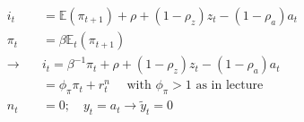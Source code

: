 {\begin{enumerate}[label=(\alph*)]
{$$
\begin{aligned}
i_{t} & =\mathbb{E}\left(\pi_{t+1}\right)+\rho+\left(1-\rho_{z}\right) z_{t}-\left(1-\rho_{a}\right) a_{t} \\
\pi_{t} & =\beta \mathbb{E}_{t}\left(\pi_{t+1}\right) \\
\longrightarrow \quad & i_t=\beta^{-1} \pi_{t}+\rho+\left(1-\rho_{z}\right) z_{t}-\left(1-\rho_{a}\right) a_{t} \\
& =\phi_{\pi} \pi_{t}+r_{t}^{n} \quad \text { with } \phi_{\pi}>1 \text { as in lecture } \\
n_{t} & =0 ; \quad y_{t}=a_{t} \longrightarrow \tilde{y}_{t}=0
\end{aligned}
$$
}
\end{enumerate}
}